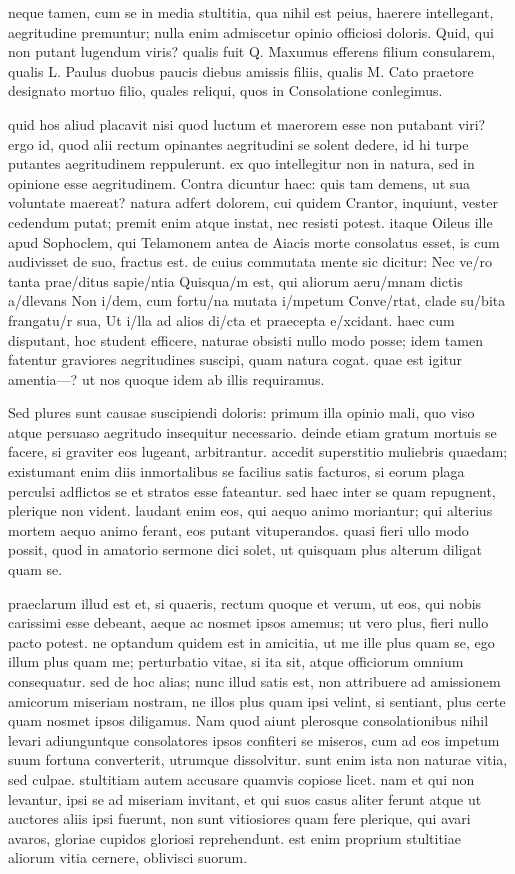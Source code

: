  neque tamen, cum se in media stultitia, qua nihil est peius, haerere intellegant, aegritudine premuntur; nulla enim admiscetur opinio officiosi doloris. Quid, qui non putant lugendum viris? qualis fuit Q. Maxumus efferens filium consularem, qualis L. Paulus duobus paucis diebus amissis filiis, qualis M. Cato praetore designato mortuo filio, quales reliqui, quos in Consolatione conlegimus.

 quid hos aliud placavit nisi quod luctum et maerorem esse non putabant viri? ergo id, quod alii rectum opinantes aegritudini se solent dedere, id hi turpe putantes aegritudinem reppulerunt. ex quo intellegitur non in natura, sed in opinione esse aegritudinem. Contra dicuntur haec: quis tam demens, ut sua voluntate maereat? natura adfert dolorem, cui quidem Crantor, inquiunt, vester cedendum putat; premit enim atque instat, nec resisti potest. itaque Oileus ille apud Sophoclem, qui Telamonem antea de Aiacis morte consolatus esset, is cum audivisset de suo, fractus est. de cuius commutata mente sic dicitur: Nec ve/ro tanta prae/ditus sapie/ntia Quisqua/m est, qui aliorum aeru/mnam dictis a/dlevans Non i/dem, cum fortu/na mutata i/mpetum Conve/rtat, clade su/bita frangatu/r sua, Ut i/lla ad alios di/cta et praecepta e/xcidant. haec cum disputant, hoc student efficere, naturae obsisti nullo modo posse; idem tamen fatentur graviores aegritudines suscipi, quam natura cogat. quae est igitur amentia—? ut nos quoque idem ab illis requiramus.

 Sed plures sunt causae suscipiendi doloris: primum illa opinio mali, quo viso atque persuaso aegritudo insequitur necessario. deinde etiam gratum mortuis se facere, si graviter eos lugeant, arbitrantur. accedit superstitio muliebris quaedam; existumant enim diis inmortalibus se facilius satis facturos, si eorum plaga perculsi adflictos se et stratos esse fateantur. sed haec inter se quam repugnent, plerique non vident. laudant enim eos, qui aequo animo moriantur; qui alterius mortem aequo animo ferant, eos putant vituperandos. quasi fieri ullo modo possit, quod in amatorio sermone dici solet, ut quisquam plus alterum diligat quam se.

 praeclarum illud est et, si quaeris, rectum quoque et verum, ut eos, qui nobis carissimi esse debeant, aeque ac nosmet ipsos amemus; ut vero plus, fieri nullo pacto potest. ne optandum quidem est in amicitia, ut me ille plus quam se, ego illum plus quam me; perturbatio vitae, si ita sit, atque officiorum omnium consequatur. sed de hoc alias; nunc illud satis est, non attribuere ad amissionem amicorum miseriam nostram, ne illos plus quam ipsi velint, si sentiant, plus certe quam nosmet ipsos diligamus. Nam quod aiunt plerosque consolationibus nihil levari adiunguntque consolatores ipsos confiteri se miseros, cum ad eos impetum suum fortuna converterit, utrumque dissolvitur. sunt enim ista non naturae vitia, sed culpae. stultitiam autem accusare quamvis copiose licet. nam et qui non levantur, ipsi se ad miseriam invitant, et qui suos casus aliter ferunt atque ut auctores aliis ipsi fuerunt, non sunt vitiosiores quam fere plerique, qui avari avaros, gloriae cupidos gloriosi reprehendunt. est enim proprium stultitiae aliorum vitia cernere, oblivisci suorum.

